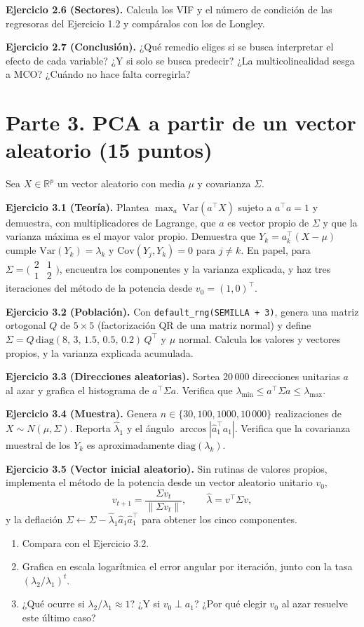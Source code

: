 \documentclass[11pt,letterpaper]{article}
\newcommand{\norm}[1]{\lVert #1\rVert}
\newcommand{\ejercicio}[1]{\par\medskip\textbf{Ejercicio #1.}\space}
\begin{document}
\ejercicio{2.6 (Sectores)} Calcula los VIF y el número de condición de las regresoras del Ejercicio 1.2 y compáralos con los de Longley.

\ejercicio{2.7 (Conclusión)} ¿Qué remedio eliges si se busca interpretar el efecto de cada variable? ¿Y si solo se busca predecir? ¿La multicolinealidad sesga a MCO? ¿Cuándo no hace falta corregirla?

\section*{Parte 3. PCA a partir de un vector aleatorio (15 puntos)}

Sea $X\in\mathbb{R}^p$ un vector aleatorio con media $\mu$ y covarianza $\Sigma$.

\ejercicio{3.1 (Teoría)} Plantea $\max_a\ \mathrm{Var}(a^\top X)$ sujeto a $a^\top a=1$ y demuestra, con multiplicadores de Lagrange, que $a$ es vector propio de $\Sigma$ y que la varianza máxima es el mayor valor propio. Demuestra que $Y_k=a_k^\top(X-\mu)$ cumple $\mathrm{Var}(Y_k)=\lambda_k$ y $\mathrm{Cov}(Y_j,Y_k)=0$ para $j\neq k$. En papel, para $\Sigma=\bigl(\begin{smallmatrix}2&1\\1&2\end{smallmatrix}\bigr)$, encuentra los componentes y la varianza explicada, y haz tres iteraciones del método de la potencia desde $v_0=(1,0)^\top$.

\ejercicio{3.2 (Población)} Con \texttt{default\_rng(SEMILLA + 3)}, genera una matriz ortogonal $Q$ de $5\times5$ (factorización QR de una matriz normal) y define $\Sigma=Q\,\mathrm{diag}(8,\,3,\,1.5,\,0.5,\,0.2)\,Q^\top$ y $\mu$ normal. Calcula los valores y vectores propios, y la varianza explicada acumulada.

\ejercicio{3.3 (Direcciones aleatorias)} Sortea 20\,000 direcciones unitarias $a$ al azar y grafica el histograma de $a^\top\Sigma a$. Verifica que $\lambda_{\min}\le a^\top\Sigma a\le\lambda_{\max}$.

\ejercicio{3.4 (Muestra)} Genera $n\in\{30,100,1000,10\,000\}$ realizaciones de $X\sim N(\mu,\Sigma)$. Reporta $\hat\lambda_1$ y el ángulo $\arccos|\hat a_1^\top a_1|$. Verifica que la covarianza muestral de los $Y_k$ es aproximadamente $\mathrm{diag}(\lambda_k)$.

\ejercicio{3.5 (Vector inicial aleatorio)} Sin rutinas de valores propios, implementa el método de la potencia desde un vector aleatorio unitario $v_0$,
\[
v_{t+1}=\frac{\Sigma v_t}{\norm{\Sigma v_t}},\qquad \hat\lambda=v^\top\Sigma v,
\]
y la deflación $\Sigma\leftarrow\Sigma-\hat\lambda_1\hat a_1\hat a_1^\top$ para obtener los cinco componentes.
\begin{enumerate}
  \item Compara con el Ejercicio 3.2.
  \item Grafica en escala logarítmica el error angular por iteración, junto con la tasa $(\lambda_2/\lambda_1)^t$.
  \item ¿Qué ocurre si $\lambda_2/\lambda_1\approx1$? ¿Y si $v_0\perp a_1$? ¿Por qué elegir $v_0$ al azar resuelve este último caso?
\end{enumerate}
\end{document}
